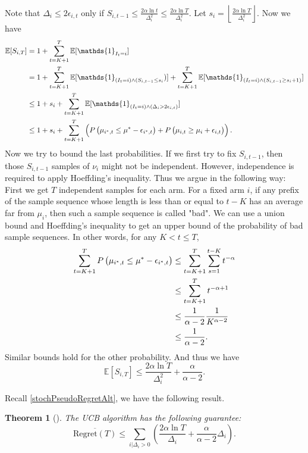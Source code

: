 \documentclass[openany]{book}
\newtheorem{theorem}{Theorem}[chapter]
\theoremstyle{definition}
\theoremstyle{remark}
\begin{document}
Note that $\Delta_i\le2\epsilon_{i,t}$ only if $S_{i,t-1}\le \frac{2\alpha\ln t}{\Delta_i^2}\le \frac{2\alpha\ln T}{\Delta_i^2}$. Let $s_i=\left\lfloor \frac{2\alpha\ln T}{\Delta_i^2}\right\rfloor$. Now we have
\begin{equation}\label{eq:UCBStep}
    \begin{split}
        \mathbb{E}[S_{i,T}] & =1+\sum_{t=K+1}^{T}\mathbb{E}[\mathds{1}_{I_t=i}] \\
         & =1+\sum_{t=K+1}^{T}\mathbb{E}[\mathds{1}_{(I_t=i)\wedge(S_{i,t-1}\le s_i})]+\sum_{t=K+1}^{T}\mathbb{E}[\mathds{1}_{(I_t=i)\wedge(S_{i,t-1}\ge s_i+1)}] \\
         & \le1+s_i+\sum_{t=K+1}^{T}\mathbb{E}[\mathds{1}_{(I_t=i)\wedge(\Delta_i>2\epsilon_{i,t})}] \\
         & \le1+s_i+\sum_{t=K+1}^{T}\del{P\del{\mu_{i^*,t}\le\mu^*-\epsilon_{i^*,t}}+P\del{\mu_{i,t}\ge\mu_i+\epsilon_{i,t}}}.
    \end{split}
\end{equation}
Now we try to bound the last probabilities. If we first try to fix $S_{i,t-1}$, then those $S_{i,t-1}$ samples of $\nu_i$ might not be independent. However, independence is required to apply Hoeffding's inequality. Thus we argue in the following way: First we get $T$ independent samples for each arm. For a fixed arm $i$, if any prefix of the sample sequence whose length is less than or equal to $t-K$ has an average far from $\mu_i$, then such a sample sequence is called "bad". We can use a union bound and Hoeffding's inequality to get an upper bound of the probability of bad sample sequences. In other words, for any $K<t\le T$,
\begin{align*}
    \sum_{t=K+1}^{T}P\del{\mu_{i^*,t}\le\mu^*-\epsilon_{i^*,t}} & \le \sum_{t=K+1}^{T}\sum_{s=1}^{t-K}t^{-\alpha} \\
     & \le \sum_{t=K+1}^{T}t^{-\alpha+1} \\
     & \le \frac{1}{\alpha-2}\frac{1}{K^{\alpha-2}} \\
     & \le \frac{1}{\alpha-2}.
\end{align*}
Similar bounds hold for the other probability. And thus we have
\begin{equation*}
    \mathbb{E}[S_{i,T}]\le \frac{2\alpha\ln T}{\Delta_i^2}+\frac{\alpha}{\alpha-2}.
\end{equation*}

Recall \eqref{stochPseudoRegretAlt}, we have the following result.
\begin{theorem}[\cite{ACF02}]\label{thm:UCBBound}
    The UCB algorithm has the following guarantee:
    \begin{equation}\label{UCBBound}
        \overline{\mathrm{Regret}(T)}\le \sum_{i|\Delta_i>0}^{}\left(\frac{2\alpha\ln T}{\Delta_i}+\frac{\alpha}{\alpha-2}\Delta_i\right).
    \end{equation}
\end{theorem}
\end{document}
